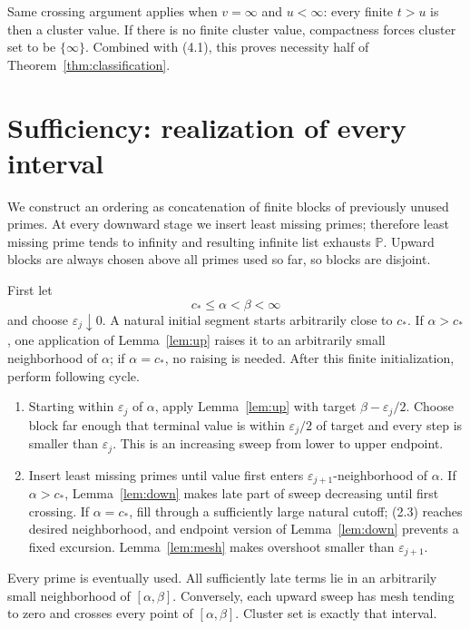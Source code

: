 \documentclass[11pt]{article}
\theoremstyle{definition}
\theoremstyle{remark}
\newcommand{\PP}{\mathbb P}
\begin{document}
Same crossing argument applies when $v=\infty$ and $u<\infty$: every finite $t>u$ is then a
cluster value.  If there is no finite cluster value, compactness forces cluster set to be
$\{\infty\}$.  Combined with (4.1), this proves necessity half of
Theorem~\ref{thm:classification}.

\section{Sufficiency: realization of every interval}
\label{sec:realization}

We construct an ordering as concatenation of finite blocks of previously unused primes.  At every
downward stage we insert least missing primes; therefore least missing prime tends to infinity and
resulting infinite list exhausts $\PP$.  Upward blocks are always chosen above all primes used so
far, so blocks are disjoint.

First let
\[
 c_*\leq\alpha<\beta<\infty
\]
and choose $\varepsilon_j\downarrow0$.  A natural initial segment starts arbitrarily close to
$c_*$.  If $\alpha>c_*$, one application of Lemma~\ref{lem:up} raises it to an arbitrarily small
neighborhood of $\alpha$; if $\alpha=c_*$, no raising is needed.  After this finite
initialization, perform following cycle.

\begin{enumerate}
\item Starting within $\varepsilon_j$ of $\alpha$, apply Lemma~\ref{lem:up} with target
$\beta-\varepsilon_j/2$.  Choose block far enough that terminal value is within
$\varepsilon_j/2$ of target and every step is smaller than $\varepsilon_j$.  This is an
increasing sweep from lower to upper endpoint.
\item Insert least missing primes until value first enters
$\varepsilon_{j+1}$-neighborhood of $\alpha$.  If $\alpha>c_*$,
Lemma~\ref{lem:down} makes late part of sweep decreasing until first crossing.  If
$\alpha=c_*$, fill through a sufficiently large natural cutoff; (2.3) reaches desired
neighborhood, and endpoint version of Lemma~\ref{lem:down} prevents a fixed excursion.
Lemma~\ref{lem:mesh} makes overshoot smaller than $\varepsilon_{j+1}$.
\end{enumerate}

Every prime is eventually used.  All sufficiently late terms lie in an arbitrarily small
neighborhood of $[\alpha,\beta]$.  Conversely, each upward sweep has mesh tending to zero and
crosses every point of $[\alpha,\beta]$.  Cluster set is exactly that interval.
\end{document}
